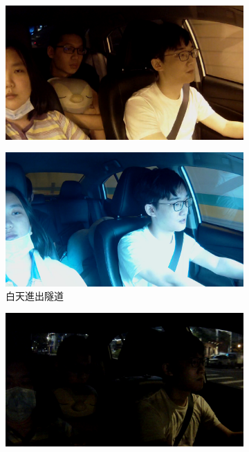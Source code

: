 \begin{figure}[t]
\begin{subfigure}[b]{0.22\textwidth}
\end{subfigure}
\begin{subfigure}[b]{0.22\textwidth}
    \includegraphics[width=\textwidth]{figures/test_4_1}
\end{subfigure}
\begin{subfigure}[b]{0.22\textwidth}
    \includegraphics[width=\textwidth]{figures/test_1_2}
    \caption {白天進出隧道}
\end{subfigure}
\begin{subfigure}[b]{0.22\textwidth}
    \includegraphics[width=\textwidth]{figures/test_2_2}

\end{subfigure}
\end{figure}
